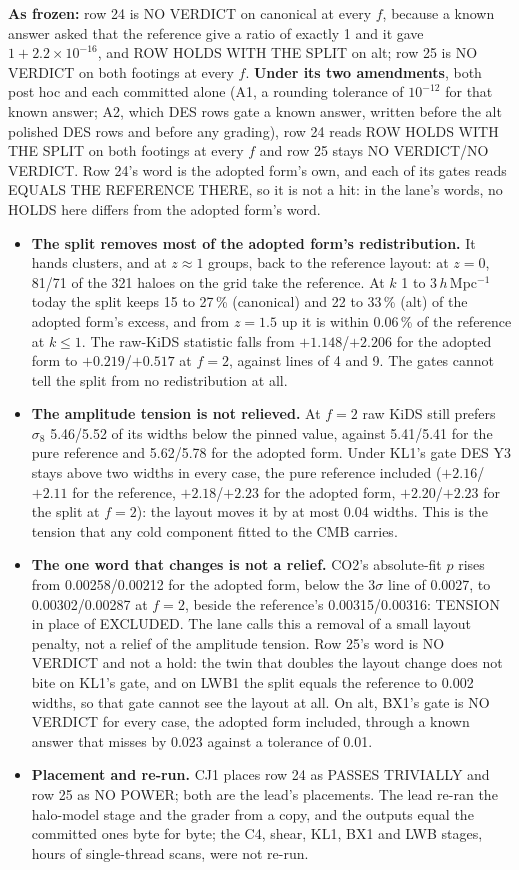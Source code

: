 \documentclass[10pt]{article}
\begin{document}
\textbf{As frozen:} row 24 is NO VERDICT on canonical at every $f$, because a known answer asked that the reference give a ratio of exactly 1 and it gave $1+2.2\times10^{-16}$, and ROW HOLDS WITH THE SPLIT on alt; row 25 is NO VERDICT on both footings at every $f$. \textbf{Under its two amendments}, both post hoc and each committed alone (A1, a rounding tolerance of $10^{-12}$ for that known answer; A2, which DES rows gate a known answer, written before the alt polished DES rows and before any grading), row 24 reads ROW HOLDS WITH THE SPLIT on both footings at every $f$ and row 25 stays NO VERDICT/NO VERDICT. Row 24's word is the adopted form's own, and each of its gates reads EQUALS THE REFERENCE THERE, so it is not a hit: in the lane's words, no HOLDS here differs from the adopted form's word.
\begin{itemize}
\item \textbf{The split removes most of the adopted form's redistribution.} It hands clusters, and at $z\approx1$ groups, back to the reference layout: at $z=0$, 81/71 of the 321 haloes on the grid take the reference. At $k$ 1 to 3\,$h$\,Mpc$^{-1}$ today the split keeps 15 to 27\,\% (canonical) and 22 to 33\,\% (alt) of the adopted form's excess, and from $z=1.5$ up it is within 0.06\,\% of the reference at $k\le1$. The raw-KiDS statistic falls from $+1.148$/$+2.206$ for the adopted form to $+0.219$/$+0.517$ at $f=2$, against lines of 4 and 9. The gates cannot tell the split from no redistribution at all.
\item \textbf{The amplitude tension is not relieved.} At $f=2$ raw KiDS still prefers $\sigma_8$ 5.46/5.52 of its widths below the pinned value, against 5.41/5.41 for the pure reference and 5.62/5.78 for the adopted form. Under KL1's gate DES Y3 stays above two widths in every case, the pure reference included ($+2.16$/$+2.11$ for the reference, $+2.18$/$+2.23$ for the adopted form, $+2.20$/$+2.23$ for the split at $f=2$): the layout moves it by at most 0.04 widths. This is the tension that any cold component fitted to the CMB carries.
\item \textbf{The one word that changes is not a relief.} CO2's absolute-fit $p$ rises from 0.00258/0.00212 for the adopted form, below the 3$\sigma$ line of 0.0027, to 0.00302/0.00287 at $f=2$, beside the reference's 0.00315/0.00316: TENSION in place of EXCLUDED. The lane calls this a removal of a small layout penalty, not a relief of the amplitude tension. Row 25's word is NO VERDICT and not a hold: the twin that doubles the layout change does not bite on KL1's gate, and on LWB1 the split equals the reference to 0.002 widths, so that gate cannot see the layout at all. On alt, BX1's gate is NO VERDICT for every case, the adopted form included, through a known answer that misses by 0.023 against a tolerance of 0.01.
\item \textbf{Placement and re-run.} CJ1 places row 24 as PASSES TRIVIALLY and row 25 as NO POWER; both are the lead's placements. The lead re-ran the halo-model stage and the grader from a copy, and the outputs equal the committed ones byte for byte; the C4, shear, KL1, BX1 and LWB stages, hours of single-thread scans, were not re-run.
\end{itemize}
\end{document}
